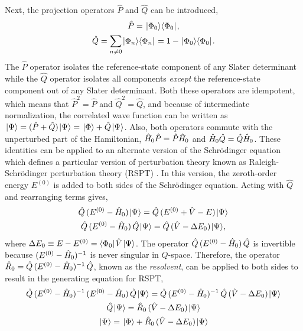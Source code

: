 \documentclass[thesis.tex]{subfiles}
\begin{document}
Next, the projection operators $\hat{P}$ and $\hat{Q}$ can be introduced,
\begin{gather}
  \hat{P} = \hspace{1pt}\lvert \Phi_{0} \rangle\langle \Phi_{0} |\hspace{1pt}, \\
  \hat{Q} = \sum_{n\neq 0}\hspace{1pt}\lvert \Phi_{n} \rangle\langle \Phi_{n} |\hspace{1pt} = 1 - \hspace{1pt}\lvert \Phi_{0} \rangle\langle \Phi_{0} |\hspace{1pt}.
\end{gather}
The $\hat{P}$ operator isolates the reference-state component of any Slater determinant while the $\hat{Q}$ operator isolates all components \textit{except} the reference-state component out of any Slater determinant.  Both these operators are idempotent, which means that $\hat{P}^{2} = \hat{P}$ and $\hat{Q}^{2} = \hat{Q}$, and because of intermediate normalization, the correlated wave function can be written as $\hspace{1pt}\lvert \Psi \rangle = \mathop{(\hat{P} + \hat{Q})}\hspace{1pt}\lvert \Psi \rangle = \hspace{1pt}\lvert \Phi \rangle + \hat{Q}\hspace{1pt}\lvert \Psi \rangle$.  Also, both operators commute with the unperturbed part of the Hamiltonian, $\hat{H}\hspace{-1pt}_{0}\hat{P} = \hat{P}\hat{H}\hspace{-1pt}_{0}$ and $\hat{H}\hspace{-1pt}_{0}\hat{Q} = \hat{Q}\hat{H}\hspace{-1pt}_{0}$.  These identities can be applied to an alternate version of the Schr\"{o}dinger equation which defines a particular version of perturbation theory known as Raleigh-Schr\"{o}dinger perturbation theory (RSPT) \cite{RAYLEIGH1894,SCHRODINGER1926}. In this version, the zeroth-order energy $E^{(0)}$ is added to both sides of the Schr\"{o}dinger equation.  Acting with $\hat{Q}$ and rearranging terms gives,
\begin{gather}
  \hat{Q}\mathop{(E^{(0)} - \hat{H}\hspace{-1pt}_{0})}\hspace{1pt}\lvert \Psi \rangle = \hat{Q}\mathop{(E^{(0)} + \hat{V} - E)}\hspace{1pt}\lvert \Psi \rangle \notag \\
  \hat{Q}\mathop{(E^{(0)} - \hat{H}\hspace{-1pt}_{0})}\hat{Q}\hspace{1pt}\lvert \Psi \rangle = \hat{Q}\mathop{(\hat{V} - \Delta E_{0})}\hspace{1pt}\lvert \Psi \rangle,
\end{gather}
where $\Delta E_{0} \equiv E - E^{(0)} = \langle \Phi_{0} |\hspace{1pt}\hat{V}\hspace{1pt}\lvert \Psi \rangle$.  The operator $\hat{Q}\mathop{(E^{(0)} - \hat{H}\hspace{-1pt}_{0})}\hat{Q}$ is invertible because $\mathop{(E^{(0)} - \hat{H}\hspace{-1pt}_{0})^{-1}}$ is never singular in $Q$-space.  Therefore, the operator $\hat{R}_{0} = \hat{Q}\mathop{(E^{(0)} - \hat{H}\hspace{-1pt}_{0})^{-1}}\hat{Q}$, known as the \textit{resolvent}, can be applied to both sides to result in the generating equation for RSPT,
\begin{gather}
  \hat{Q}\mathop{(E^{(0)} - \hat{H}\hspace{-1pt}_{0})^{-1}}\mathop{(E^{(0)} - \hat{H}\hspace{-1pt}_{0})}\hat{Q}\hspace{1pt}\lvert \Psi \rangle = \hat{Q}\mathop{(E^{(0)} - \hat{H}\hspace{-1pt}_{0})^{-1}}\hat{Q}\mathop{(\hat{V} - \Delta E_{0})}\hspace{1pt}\lvert \Psi \rangle \notag \\
  \hat{Q}\hspace{1pt}\lvert \Psi \rangle = \hat{R}_{0}\mathop{(\hat{V} - \Delta E_{0})}\hspace{1pt}\lvert \Psi \rangle \notag \\
  \hspace{1pt}\lvert \Psi \rangle = \hspace{1pt}\lvert \Phi \rangle + \hat{R}_{0}\mathop{(\hat{V} - \Delta E_{0})}\hspace{1pt}\lvert \Psi \rangle \label{eq:MBPT_Q}
\end{gather}
\end{document}
